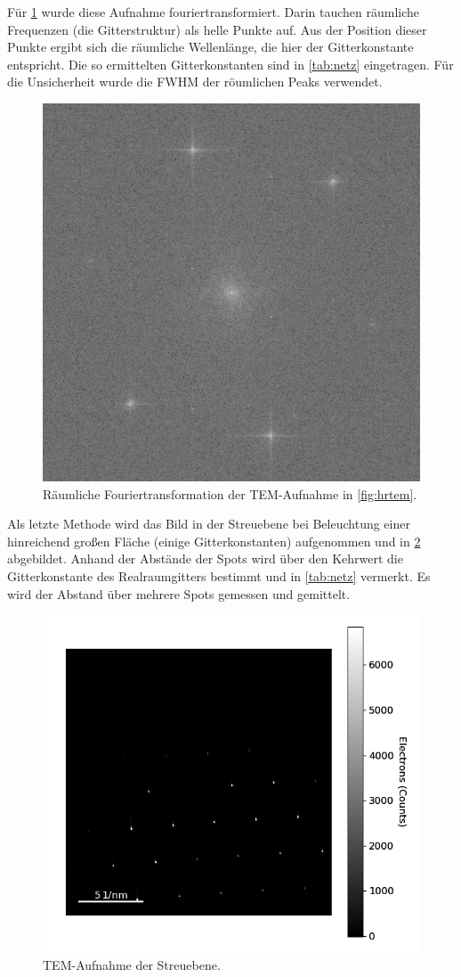   Für \cref{fig:ft} wurde diese Aufnahme fouriertransformiert.
  Darin tauchen räumliche Frequenzen (die Gitterstruktur) als helle Punkte auf.
  Aus der Position dieser Punkte ergibt sich die räumliche Wellenlänge, die hier der Gitterkonstante entspricht.
  Die so ermittelten Gitterkonstanten sind in \cref{tab:netz} eingetragen.
  Für die Unsicherheit wurde die FWHM der röumlichen Peaks verwendet.

	\begin{figure}[H]
  \centering
			\includegraphics[width= 0.4 \linewidth]{img/tem_hrtem_crop_fft}
			\caption{
        Räumliche Fouriertransformation der TEM-Aufnahme in \cref{fig:hrtem}.
			}
			\label{fig:ft}
	\end{figure}

  Als letzte Methode wird das Bild in der Streuebene bei Beleuchtung einer hinreichend großen Fläche (einige Gitterkonstanten) aufgenommen und in \cref{fig:diff} abgebildet.
  Anhand der Abstände der Spots wird über den Kehrwert die Gitterkonstante des Realraumgitters bestimmt und in \cref{tab:netz} vermerkt.
  Es wird der Abstand über mehrere Spots gemessen und gemittelt.

	\begin{figure}[H]
  \centering
			\includegraphics[width= 0.6 \linewidth]{img/tem_diff}
			\caption{
        TEM-Aufnahme der Streuebene.
			}
			\label{fig:diff}
	\end{figure}



